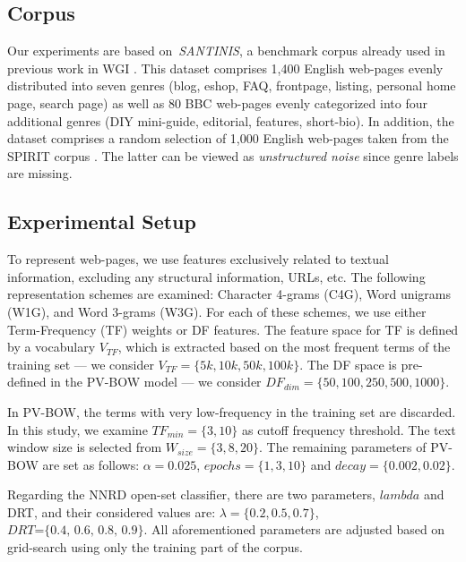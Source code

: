 \subsection{Corpus}\label{sec:corpora}
Our experiments are based on~\textit{SANTINIS}, a benchmark corpus already used in previous work in WGI \cite{mehler2010genres_on_web,pritsos2018open,santini2007automatic}. This dataset comprises 1,400 English web-pages evenly distributed into seven genres (blog, eshop, FAQ, frontpage, listing, personal home page, search page) as well as 80 BBC web-pages evenly categorized into four additional genres (DIY mini-guide, editorial, features, short-bio). In addition, the dataset comprises a random selection of 1,000 English web-pages taken from the SPIRIT corpus \cite{joho2004spirit}. The latter can be viewed as \emph{unstructured noise} since genre labels are missing. 

%
\subsection{Experimental Setup}\label{sec:evaluation_measures}
To represent web-pages, we use features exclusively related to textual information, excluding any structural information, URLs, etc. The following representation schemes are examined: Character 4-grams (C4G), Word unigrams (W1G), and Word 3-grams (W3G). For each of these schemes, we use either Term-Frequency (TF) weights or DF features. The feature space for TF is defined by a vocabulary $V_{TF}$, which is extracted based on the most frequent terms of the training set --- we consider $V_{TF}=\{5k,10k,50k,100k\}$. The DF space is pre-defined in the PV-BOW model --- we consider $DF_{dim}=\{50,100,250,500,1000\}$.

In PV-BOW, the terms with very low-frequency in the training set are discarded. In this study, we examine $TF_{min}=\{3,10\}$ as cutoff frequency threshold. The text window size is selected from $W_{size}=\{3,8,20\}$. The remaining parameters of PV-BOW are set as follows: $\alpha=0.025$, $epochs=\{1, 3, 10\}$ and $decay=\{0.002, 0.02\}$.

Regarding the NNRD open-set classifier, there are two parameters, $lambda$ and DRT, and their considered values are: $\lambda =\{0.2, 0.5, 0.7\}$, $DRT\textit{=\{0.4, 0.6, 0.8, 0.9\}}$. All aforementioned parameters are adjusted based on grid-search using only the training part of the corpus.

